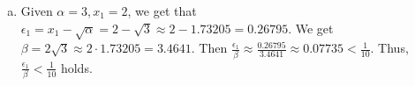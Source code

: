 \documentclass[11pt]{article}
\begin{document}
\begin{exercise}{16}
\begin{solution}
\begin{enumerate} [(a)]
\begin{proof}
\begin{equation*}
\begin{split}
                    & = \epsilon_n - \frac{\epsilon_n \sqrt{\alpha}}{x_n} \\
                    & = \epsilon_n \left( 1 - \frac{\sqrt{\alpha}}{x_n} \right) \\
                    & = \epsilon_n \left( \frac{x_n - \sqrt{\alpha}}{x_n} \right) \\
                    & = \epsilon_n \left( \frac{\epsilon_n}{x_n} \right) \\
                    2 \epsilon_{n+1} & = \frac{\epsilon_n^2}{x_n} \\
                    \epsilon_{n+1} & = \frac{\epsilon_n^2}{2x_n} \\
                    & < \frac{\epsilon_n^2}{2 \sqrt{\alpha}}
                \end{split}
            \end{equation*}
            The last inequality, $\frac{\epsilon_n^2}{2x_n} < \frac{\epsilon_n^2}{2 \sqrt{\alpha}}$ holds because we proved earlier that $x_n > \sqrt{\alpha}$. \\

            Let $\beta = 2 \sqrt{\alpha}$. From the inequality $\epsilon_{n+1} < \frac{\epsilon_n^2}{\beta}$, we define $s_n = \frac{\epsilon_n}{\beta}$. Then $s_{n+1} = \frac{\epsilon_{n+1}}{\beta} < \frac{1}{\beta} \frac{\epsilon_n^2}{\beta} = s_n^2$. This establishes a recursive inequality, $s_{n+1} < s_n^2$. We can show by induction that $s_n < s_1^{2^{n-1}}$. Base case ($n=1$): $s_1 < s_1^{2^{n-1}}$. Inductive step: Assuming $s_n < s_1^{2^{n-1}}$, we have $s_{n+1} < s_n^2 < (s_1^{2^{n-1}})^2 = s_1^{2^n}$. Therefore, $s_{n+1} < s_1^{2n}$. 

            From the above result, we can multiply both sides by $\beta$ to get $\epsilon_{n+1} = \beta s_{n+1} < \beta s_1^{2n} = \beta \left( \frac{\epsilon_1}{\beta} \right) ^{2^n}$. Thus, $\epsilon_{n+1} < \beta \left( \frac{\epsilon_1}{\beta} \right) ^{2^n}$.
        \end{proof}
        \item \begin{solution}
            Given $\alpha = 3, x_1 = 2$, we get that $\epsilon_1 = x_1 - \sqrt{\alpha} = 2 - \sqrt{3} \approx 2 - 1.73205 = 0.26795$. We get $\beta = 2 \sqrt{3} \approx 2 \cdot 1.73205 = 3.4641$. Then $\frac{\epsilon_1}{\beta} \approx \frac{0.26795}{3.4641} \approx 0.07735 < \frac{1}{10}$. Thus, $\frac{\epsilon_1}{\beta} < \frac{1}{10}$ holds. 


\end{solution}
\end{enumerate}
\end{solution}
\end{exercise}
\end{document}
